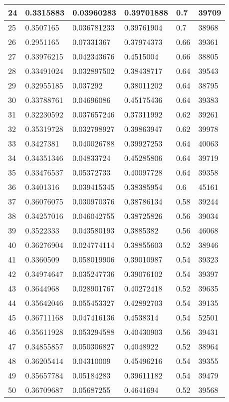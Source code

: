 \begin{longtable}{|l|l|l|l|l|l|}
24 & 0.3315883 & 0.03960283 & 0.39701888 & 0.7 & 39709 \\ \hline 
25 & 0.3507165 & 0.036781233 & 0.39761904 & 0.7 & 38968 \\ \hline 
26 & 0.2951165 & 0.07331367 & 0.37974373 & 0.66 & 39361 \\ \hline 
27 & 0.33976215 & 0.042343676 & 0.4515004 & 0.66 & 38805 \\ \hline 
28 & 0.33491024 & 0.032897502 & 0.38438717 & 0.64 & 39543 \\ \hline 
29 & 0.32955185 & 0.037292 & 0.38011202 & 0.64 & 38795 \\ \hline 
30 & 0.33788761 & 0.04696086 & 0.45175436 & 0.64 & 39383 \\ \hline 
31 & 0.32230592 & 0.037657246 & 0.37311992 & 0.62 & 39261 \\ \hline 
32 & 0.35319728 & 0.032798927 & 0.39863947 & 0.62 & 39978 \\ \hline 
33 & 0.3427381 & 0.040026788 & 0.39927253 & 0.64 & 40063 \\ \hline 
34 & 0.34351346 & 0.04833724 & 0.45285806 & 0.64 & 39719 \\ \hline 
35 & 0.33476537 & 0.05372733 & 0.40097728 & 0.64 & 39358 \\ \hline 
36 & 0.3401316 & 0.039415345 & 0.38385954 & 0.6 & 45161 \\ \hline 
37 & 0.36076075 & 0.030970376 & 0.38786134 & 0.58 & 39244 \\ \hline 
38 & 0.34257016 & 0.046042755 & 0.38725826 & 0.56 & 39034 \\ \hline 
39 & 0.3522333 & 0.043580193 & 0.3885382 & 0.56 & 46068 \\ \hline 
40 & 0.36276904 & 0.024774114 & 0.38855603 & 0.52 & 38946 \\ \hline 
41 & 0.3360509 & 0.058019906 & 0.39010987 & 0.54 & 39323 \\ \hline 
42 & 0.34974647 & 0.035247736 & 0.39076102 & 0.54 & 39397 \\ \hline 
43 & 0.3644968 & 0.028901767 & 0.40272418 & 0.52 & 39635 \\ \hline 
44 & 0.35642046 & 0.055453327 & 0.42892703 & 0.54 & 39135 \\ \hline 
45 & 0.36711168 & 0.047416136 & 0.4538314 & 0.54 & 52501 \\ \hline 
46 & 0.35611928 & 0.053294588 & 0.40430903 & 0.56 & 39431 \\ \hline 
47 & 0.34855857 & 0.050306827 & 0.4048922 & 0.52 & 38964 \\ \hline 
48 & 0.36205414 & 0.04310009 & 0.45496216 & 0.54 & 39355 \\ \hline 
49 & 0.35657784 & 0.05184283 & 0.39611182 & 0.54 & 39479 \\ \hline 
50 & 0.36709687 & 0.05687255 & 0.4641694 & 0.52 & 39568 \\ \hline 
\end{longtable}